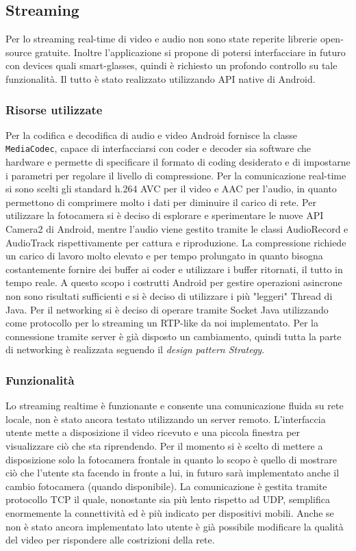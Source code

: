 \documentclass[conference]{IEEEtran}
\begin{document}
	\subsection{Streaming}
		Per lo streaming real-time di video e audio non sono state reperite librerie open-source gratuite.
		Inoltre l'applicazione si propone di potersi interfacciare in futuro con devices quali smart-glasses,
		quindi è richiesto un profondo controllo su tale funzionalità. Il tutto è stato realizzato utilizzando API native di Android.

		\subsubsection{Risorse utilizzate}
			Per la codifica e decodifica di audio e video Android fornisce la classe \texttt{MediaCodec}, capace di interfacciarsi con coder e decoder sia software che hardware e permette di specificare il formato di coding desiderato e di impostarne i parametri per regolare il livello di compressione. Per la comunicazione real-time si sono scelti gli standard h.264 AVC per il video e AAC per l'audio, in quanto permettono di comprimere molto i dati per diminuire il carico di rete.
			Per utilizzare la fotocamera si è deciso di esplorare e sperimentare le nuove API Camera2 di Android, mentre l'audio viene gestito tramite le classi AudioRecord e AudioTrack rispettivamente per cattura e riproduzione.
			La compressione richiede un carico di lavoro molto elevato e per tempo prolungato in quanto bisogna costantemente fornire dei buffer ai coder e utilizzare i buffer ritornati, il tutto in tempo reale. A questo scopo i costrutti Android per gestire operazioni asincrone non sono risultati sufficienti e si è deciso di utilizzare i più "leggeri" Thread di Java. 
			Per il networking si è deciso di operare tramite Socket Java utilizzando come protocollo per lo streaming un RTP-like da noi implementato. Per la connessione tramite server è già disposto un cambiamento, quindi tutta la parte di networking è realizzata seguendo il \textit{design pattern Strategy}.

		\subsubsection{Funzionalità}
			Lo streaming realtime è funzionante e consente una comunicazione fluida su rete locale, non è stato ancora testato utilizzando un server remoto. L'interfaccia utente mette a disposizione il video ricevuto e una piccola finestra per visualizzare ciò che sta riprendendo. Per il momento si è scelto di mettere a disposizione solo la fotocamera frontale in quanto lo scopo è quello di mostrare ciò che l'utente sta facendo in fronte a lui, in futuro sarà implementato anche il cambio fotocamera (quando disponibile).
			La comunicazione è gestita tramite protocollo TCP il quale, nonostante sia più lento rispetto ad UDP, semplifica enormemente la connettività ed è più indicato per dispositivi mobili. Anche se non è stato ancora implementato lato utente è già possibile modificare la qualità del video per rispondere alle costrizioni della rete.
\end{document}
